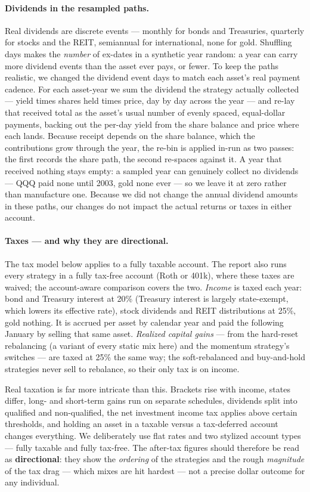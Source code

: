 \documentclass[11pt]{article}
\begin{document}
\paragraph{Dividends in the resampled paths.} Real dividends are discrete events --- monthly for bonds
and Treasuries, quarterly for stocks and the REIT, semiannual for international, none for gold.
Shuffling days makes the \emph{number} of ex-dates in a synthetic year random: a year can carry more
dividend events than the asset ever pays, or fewer. To keep the paths realistic, we changed the
dividend event days to match each asset's real payment cadence. For each asset-year we sum the dividend
the strategy actually collected ---
yield times shares held times price, day by day across the year --- and re-lay that received total as
the asset's usual number of evenly spaced, equal-dollar payments, backing out the per-day yield from
the share balance and price where each lands. Because receipt depends on the share balance, which the
contributions grow through the year, the re-bin is applied in-run as two passes: the first records the
share path, the second re-spaces against it. A year that received nothing stays empty: a sampled year
can genuinely collect no dividends --- QQQ paid none until 2003, gold none ever --- so we leave it at
zero rather than manufacture one. Because we did not change the
annual dividend amounts in these paths, our changes do not impact the actual returns or taxes in either
account.

\paragraph{Taxes --- and why they are directional.} The tax model below applies to a fully taxable
account. The report also runs every strategy in a fully tax-free account (Roth or 401k), where these
taxes are waived; the account-aware comparison covers the two. \emph{Income} is taxed each year: bond and Treasury interest at 20\% (Treasury interest is largely
state-exempt, which lowers its effective rate), stock dividends and REIT distributions at 25\%, gold
nothing. It is accrued per asset by calendar year and paid the following January by selling that same
asset. \emph{Realized capital gains} --- from the hard-reset rebalancing (a variant of every static mix
here) and the momentum strategy's switches --- are taxed at 25\% the same way; the soft-rebalanced and
buy-and-hold strategies never sell to rebalance, so their only tax is on income.

Real taxation is far more intricate than this. Brackets rise with income, states differ, long- and
short-term gains run on separate schedules, dividends split into qualified and non-qualified, the net
investment income tax applies above certain thresholds, and holding an asset in a taxable versus a
tax-deferred account changes everything. We deliberately use flat rates and two stylized account types
--- fully taxable and fully tax-free. The
after-tax figures should therefore be read as \textbf{directional}: they show the \emph{ordering} of
the strategies and the rough \emph{magnitude} of the tax drag --- which mixes are hit hardest --- not a
precise dollar outcome for any individual.
\end{document}
